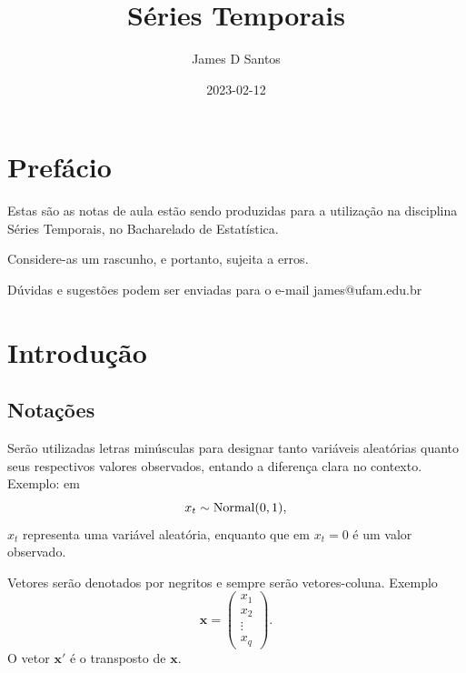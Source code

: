 \documentclass[
  letterpaper,
  DIV=11,
  numbers=noendperiod]{scrreprt}
\title{Séries Temporais}
\author{James D Santos}
\date{2023-02-12}
\renewcommand*\contentsname{Table of contents}
\newcommand\contentsname{Table of contents}
\theoremstyle{plain}
\theoremstyle{definition}
\theoremstyle{definition}
\theoremstyle{remark}
\begin{document}
\maketitle
\ifdefined\Shaded\renewenvironment{Shaded}{\begin{tcolorbox}[sharp corners, boxrule=0pt, frame hidden, borderline west={3pt}{0pt}{shadecolor}, enhanced, interior hidden, breakable]}{\end{tcolorbox}}\fi

\renewcommand*\contentsname{Table of contents}
{
\hypersetup{linkcolor=}
\setcounter{tocdepth}{2}
\tableofcontents
}

\hypertarget{prefuxe1cio}{%
\chapter*{Prefácio}\label{prefuxe1cio}}


Estas são as notas de aula estão sendo produzidas para a utilização na
disciplina Séries Temporais, no Bacharelado de Estatística.

Considere-as um rascunho, e portanto, sujeita a erros.

Dúvidas e sugestões podem ser enviadas para o e-mail james@ufam.edu.br


\hypertarget{introduuxe7uxe3o}{%
\chapter{Introdução}\label{introduuxe7uxe3o}}

\hypertarget{notauxe7uxf5es}{%
\section{Notações}\label{notauxe7uxf5es}}

Serão utilizadas letras minúsculas para designar tanto variáveis
aleatórias quanto seus respectivos valores observados, entando a
diferença clara no contexto. Exemplo: em \[x_t\sim\hbox{Normal}(0,1),\]
\(x_t\) representa uma variável aleatória, enquanto que em \(x_t=0\) é
um valor observado.

Vetores serão denotados por negritos e sempre serão vetores-coluna.
Exemplo
\[\boldsymbol{x}=\left(\begin{array}{c}x_1 \\ x_2 \\ \vdots \\ x_q\end{array}\right).\]
O vetor \(\boldsymbol{x}'\) é o transposto de \(\boldsymbol{x}\).
\end{document}
